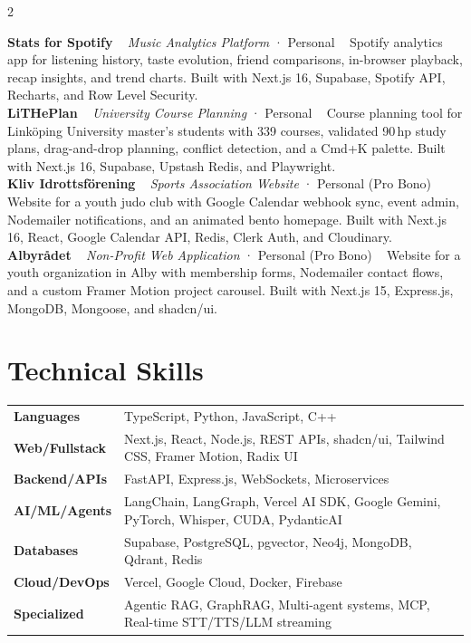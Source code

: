 \documentclass{modernsimplecv}
\newcommand{\cvevent}[4]{
    \textbf{#1} \ %
    \emph{#2} · #3 \ %
    \small{#4} \\[1em] %
}
\newlength{\leftcolwidth}
\begin{document}
\begin{paracol}{2}
{\begin{minipage}[t]{\leftcolwidth}
\cvevent{Stats for Spotify}{Music Analytics Platform}{Personal}{%
Spotify analytics app for listening history, taste evolution, friend comparisons, in-browser playback, recap insights, and trend charts. Built with Next.js 16, Supabase, Spotify API, Recharts, and Row Level Security.
}

\cvevent{LiTHePlan}{University Course Planning}{Personal}{%
Course planning tool for Linköping University master's students with 339 courses, validated 90\,hp study plans, drag-and-drop planning, conflict detection, and a Cmd+K palette. Built with Next.js 16, Supabase, Upstash Redis, and Playwright.
}

\cvevent{Kliv Idrottsförening}{Sports Association Website}{Personal (Pro Bono)}{%
Website for a youth judo club with Google Calendar webhook sync, event admin, Nodemailer notifications, and an animated bento homepage. Built with Next.js 16, React, Google Calendar API, Redis, Clerk Auth, and Cloudinary.
}

\cvevent{Albyrådet}{Non-Profit Web Application}{Personal (Pro Bono)}{%
Website for a youth organization in Alby with membership forms, Nodemailer contact flows, and a custom Framer Motion project carousel. Built with Next.js 15, Express.js, MongoDB, Mongoose, and shadcn/ui.
}

\vspace{4em}
\end{minipage}



}
\switchcolumn

\small

\section*{Technical Skills}
\begin{tabularx}{\linewidth}{@{}lX@{}}
  \textbf{Languages} & TypeScript, Python, JavaScript, C++ \\
  \textbf{Web/Fullstack} & Next.js, React, Node.js, REST APIs, shadcn/ui, Tailwind CSS, Framer Motion, Radix UI \\
  \textbf{Backend/APIs} & FastAPI, Express.js, WebSockets, Microservices \\
  \textbf{AI/ML/Agents} & LangChain, LangGraph, Vercel AI SDK, Google Gemini, PyTorch, Whisper, CUDA, PydanticAI \\
  \textbf{Databases} & Supabase, PostgreSQL, pgvector, Neo4j, MongoDB, Qdrant, Redis \\
  \textbf{Cloud/DevOps} & Vercel, Google Cloud, Docker, Firebase \\
  \textbf{Specialized} & Agentic RAG, GraphRAG, Multi-agent systems, MCP, Real-time STT/TTS/LLM streaming \\
\end{tabularx}



\end{paracol}
\end{document}
